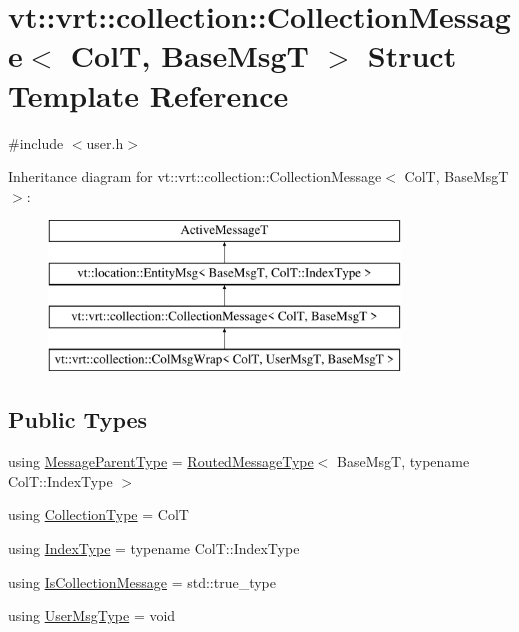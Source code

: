 \hypertarget{structvt_1_1vrt_1_1collection_1_1_collection_message}{}\section{vt\+:\+:vrt\+:\+:collection\+:\+:Collection\+Message$<$ ColT, Base\+MsgT $>$ Struct Template Reference}
\label{structvt_1_1vrt_1_1collection_1_1_collection_message}


{\ttfamily \#include $<$user.\+h$>$}

Inheritance diagram for vt\+:\+:vrt\+:\+:collection\+:\+:Collection\+Message$<$ ColT, Base\+MsgT $>$\+:\begin{figure}[H]
\begin{center}
\leavevmode
\includegraphics[height=4.000000cm]{structvt_1_1vrt_1_1collection_1_1_collection_message}
\end{center}
\end{figure}
\subsection*{Public Types}
\begin{DoxyCompactItemize}
\item 
using \hyperlink{structvt_1_1vrt_1_1collection_1_1_collection_message_ab20243365b318ce3149cd7f0110f8d7b}{Message\+Parent\+Type} = \hyperlink{namespacevt_1_1vrt_1_1collection_a4ea3c384581b0276bba9a69a33111cb7}{Routed\+Message\+Type}$<$ Base\+MsgT, typename Col\+T\+::\+Index\+Type $>$
\item 
using \hyperlink{structvt_1_1vrt_1_1collection_1_1_collection_message_afa8f7f5da0139ffa449144d8d35d7fe3}{Collection\+Type} = ColT
\item 
using \hyperlink{structvt_1_1vrt_1_1collection_1_1_collection_message_a324978c38e67d1bfa86c8db172e77594}{Index\+Type} = typename Col\+T\+::\+Index\+Type
\item 
using \hyperlink{structvt_1_1vrt_1_1collection_1_1_collection_message_a186fceb015a3415a482d99851432222b}{Is\+Collection\+Message} = std\+::true\+\_\+type
\item 
using \hyperlink{structvt_1_1vrt_1_1collection_1_1_collection_message_ace5b4eaa94f5b209ae321edd6c0b6c19}{User\+Msg\+Type} = void
\end{DoxyCompactItemize}
